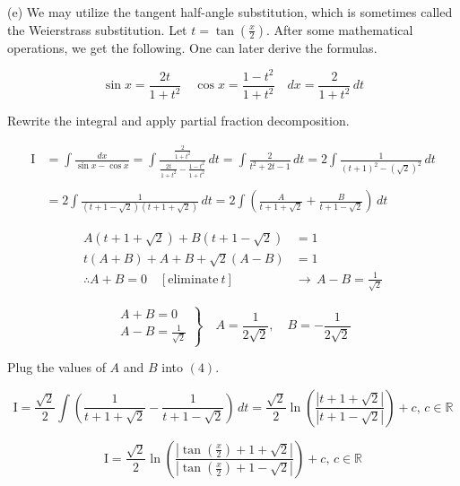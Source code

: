 \documentclass{article}
\begin{document}
\hfill

\noindent (e) We may utilize the tangent half-angle substitution, which is sometimes called the Weierstrass substitution. Let $\displaystyle t = \tan\left(\frac x2\right)$. After some mathematical operations, we get the following. One can later derive the formulas.

\begin{equation*}
\sin x={\frac{2t}{1+t^{2}}}\quad\cos x={\frac{1-t^{2}}{1+t^{2}}}\quad dx={\frac2{1+t^{2}}}\,dt
\end{equation*}

\hfill

\noindent Rewrite the integral and apply partial fraction decomposition.

\begin{align}
\mathrm{I} &= \int\frac{dx}{\sin x - \cos x} = \int\frac{\frac2{1+t^2}}{\frac{2t}{1+t^2} -\frac{1-t^2}{1+t^2}}\,dt=\int\frac2{t^2+2t-1}\,dt=2\int\frac1{(t+1)^2-(\sqrt2)^2}\,dt\nonumber\\\nonumber\\&=2\int\frac 1{\left(t+1-\sqrt2\right)\left(t+1+\sqrt2\right)}\,dt=2\int\left( \frac A{t+1+\sqrt2} + \frac B{t+1-\sqrt2}\right)\,dt
\end{align}

\begin{align*}
A(t+1+\sqrt2)+B(t+1-\sqrt2) &= 1\\
t(A+B) + A + B+\sqrt2(A-B) &= 1\\
\therefore A+B =0 \quad[\text{eliminate}\ t] \,&\rightarrow\, A- B= \frac1{\sqrt2}
\end{align*}

\[
\left.
\begin{array}{ll}
A+B=0  \\
\displaystyle A-B = \frac1{\sqrt2}
\end{array}
\right\}
\quad A=\frac1{2\sqrt2},\quad B=-\frac1{2\sqrt2}
\]

\hfill

\noindent Plug the values of $A$ and $B$ into $(4)$.

\begin{equation*}
\mathrm{I} =\frac{\sqrt2}2\int\left(\frac 1{t+1+\sqrt2} - \frac 1{t+1-\sqrt2}\right) \,dt = \frac{\sqrt2}2 \ln\left(\frac{|t+1+\sqrt2|}{|t+1-\sqrt2|}\right) +c,\,c\in\mathbb{R}\end{equation*}

\begin{equation*}
\boxed{\mathrm{I} = \frac{\sqrt2}2 \ln\left(\frac{\displaystyle\left|\tan\left(\frac x2\right)+1+\sqrt2\right|}{\displaystyle\left|\tan\left(\frac x2\right)+1-\sqrt2\right|}\right) +c,\,c\in\mathbb{R}}
\end{equation*}
\end{document}
